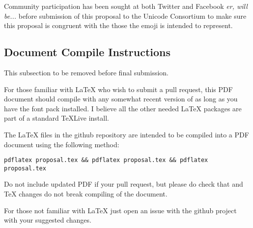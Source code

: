 Community participation has been sought at both Twitter and Facebook \emph{er, will be...}
before submission of this proposal to the Unicode Consortium to make sure this proposal is
congruent with the those the emoji is intended to represent.

\subsection*{Document Compile Instructions}
This subsection to be removed before final submission.

For those familiar with \LaTeX{} who wish to submit a pull request, this PDF document
should compile with any somewhat recent version of
 as long as you have the
 font pack installed. I believe
all the other needed \LaTeX{} packages are part of a standard \TeX{}Live install.

The \LaTeX{} files in the github repository are intended to be compiled into a PDF document
using the following method:

\begin{verbatim}
pdflatex proposal.tex && pdflatex proposal.tex && pdflatex proposal.tex
\end{verbatim}

Do not include updated PDF if your pull request, but please do check that and TeX changes
do not break compiling of the document.

For those not familiar with \LaTeX{} just open an issue with the github project with your
suggested changes.

